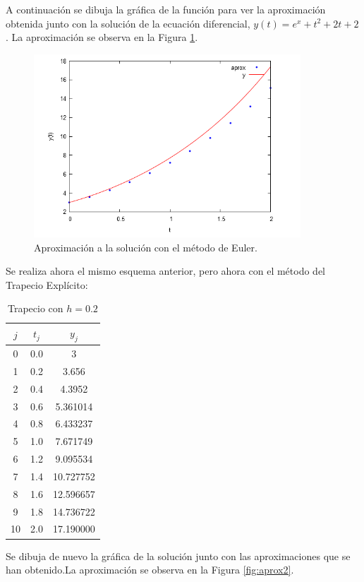 \documentclass{article}
\theoremstyle{theorem-style}  %
\theoremstyle{definition-style}
\theoremstyle{example-style}
\begin{document}
A continuación se dibuja la gráfica de la función para ver la aproximación obtenida junto con la solución de la ecuación diferencial, $y(t)= e^x + t^2 + 2t + 2$. La aproximación se observa en la Figura \ref{fig:aprox1}.

	\begin{figure}[h]
		\centering
		\includegraphics[width=10cm]{./Images/ejtp1-1.png}
		\caption{Aproximación a la solución con el método de Euler.} 
		\label{fig:aprox1}
	\end{figure}
	
Se realiza ahora el mismo esquema anterior, pero ahora con el método del Trapecio Explícito:

	\begin{table}[H]
		\centering
		\begin{tabular}{|| c | c | c ||}
			\hline
			\hline $j$ &  $t_j $ & $y_j$\\
			\hline 0 & 0.0 & 3 \\
			\hline 1 & 0.2 & 3.656  \\
			\hline 2 & 0.4 & 4.3952 \\
			\hline 3 & 0.6 & 5.361014 \\
			\hline 4 & 0.8 & 6.433237 \\
			\hline 5 & 1.0 & 7.671749 \\
			\hline 6 & 1.2 & 9.095534 \\
			\hline 7 & 1.4 & 10.727752 \\
			\hline 8 & 1.6 & 12.596657 \\
			\hline 9 & 1.8 & 14.736722 \\
			\hline 10 & 2.0 & 17.190000 \\
		\end{tabular}
		\caption{Trapecio con $h=0.2$}
		\label{table:trapecio-ejtp1.2}
	\end{table}
	
Se dibuja de nuevo la gráfica de la solución junto con las aproximaciones que se han obtenido.La aproximación se observa en la Figura \ref{fig:aprox2}.
	
\end{document}

